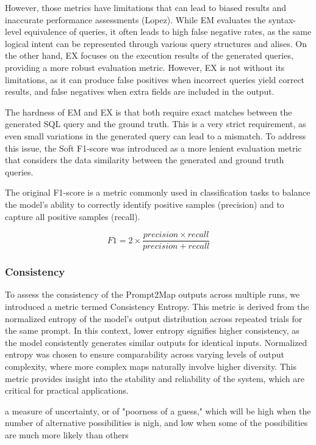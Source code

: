 However, those metrics have limitations that can lead to biased results and inaccurate performance assessments (Lopez). While EM evaluates the syntax-level equivalence of queries, it often leads to high false negative rates, as the same logical intent can be represented through various query structures and alises. On the other hand, EX focuses on the execution results of the generated queries, providing a more robust evaluation metric. However, EX is not without its limitations, as it can produce false positives when incorrect queries yield correct results, and false negatives when extra fields are included in the output.

The hardness of EM and EX is that both require exact matches between the generated SQL query and the ground truth. This is a very strict requirement, as even small variations in the generated query can lead to a mismatch. To address this issue, the Soft F1-score was introduced as a more lenient evaluation metric that considers the data similarity between the generated and ground truth queries. 

The original F1-score is a metric commonly used in classification tasks to balance the model's ability to correctly identify positive samples (precision) and to capture all positive samples (recall).

\begin{equation}
    F1 = 2 \times \frac{precision \times recall}{precision + recall}
\end{equation}

\subsubsection{Consistency}

To assess the consistency of the Prompt2Map outputs across multiple runs, we introduced a metric termed Consistency Entropy. This metric is derived from the normalized entropy of the model's output distribution across repeated trials for the same prompt. In this context, lower entropy signifies higher consistency, as the model consistently generates similar outputs for identical inputs. Normalized entropy was chosen to ensure comparability across varying levels of output complexity, where more complex maps naturally involve higher diversity. This metric provides insight into the stability and reliability of the system, which are critical for practical applications.

a measure of uncertainty, or of "poorness of a guess," which will be high when the number of alternative possibilities is nigh, and low when some of the possibilities are much more likely than others

